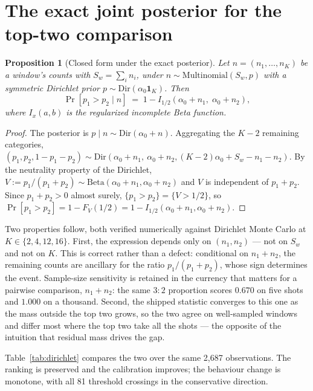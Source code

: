 \documentclass[final,5p,times,longtitle]{elsarticle}
\theoremstyle{plain}
\newtheorem{proposition}{Proposition}[section]
\begin{document}

\section{The exact joint posterior for the top-two comparison}
\label{si:dirichlet}

\begin{proposition}[Closed form under the exact posterior]
\label{prop:dirichlet}
Let $n=(n_1,\dots,n_K)$ be a window's counts with $S_w=\sum_i n_i$, under
$n\sim\mathrm{Multinomial}(S_w,p)$ with a symmetric Dirichlet prior
$p\sim\mathrm{Dir}(\alpha_0\mathbf{1}_K)$. Then
\[
  \Pr[p_1>p_2\mid n] \;=\; 1-I_{1/2}(\alpha_0+n_1,\;\alpha_0+n_2),
\]
where $I_x(a,b)$ is the regularized incomplete Beta function.
\end{proposition}

\begin{proof}
The posterior is $p\mid n\sim\mathrm{Dir}(\alpha_0+n)$. Aggregating the
$K-2$ remaining categories,
$(p_1,p_2,1-p_1-p_2)\sim\mathrm{Dir}(\alpha_0+n_1,\ \alpha_0+n_2,
(K-2)\alpha_0+S_w-n_1-n_2)$. By the neutrality property of the Dirichlet,
$V:=p_1/(p_1+p_2)\sim\mathrm{Beta}(\alpha_0+n_1,\alpha_0+n_2)$ and $V$ is
independent of $p_1+p_2$. Since $p_1+p_2>0$ almost surely,
$\{p_1>p_2\}=\{V>1/2\}$, so
$\Pr[p_1>p_2]=1-F_V(1/2)=1-I_{1/2}(\alpha_0+n_1,\alpha_0+n_2)$.
\end{proof}

Two properties follow, both verified numerically against Dirichlet Monte
Carlo at $K\in\{2,4,12,16\}$. First, the expression depends only on
$(n_1,n_2)$ --- not on $S_w$ and not on $K$. This is correct rather than a
defect: conditional on $n_1+n_2$, the remaining counts are ancillary for
the ratio $p_1/(p_1+p_2)$, whose sign determines the event. Sample-size
sensitivity is retained in the currency that matters for a pairwise
comparison, $n_1+n_2$: the same $3{:}2$ proportion scores $0.670$ on five
shots and $1.000$ on a thousand. Second, the shipped statistic converges to
this one as the mass outside the top two grows, so the two agree on
well-sampled windows and differ most where the top two take all the shots
--- the opposite of the intuition that residual mass drives the gap.

Table~\ref{tab:dirichlet} compares the two over the same 2{,}687
observations. The ranking is preserved and the calibration improves; the
behaviour change is monotone, with all 81 threshold crossings in the
conservative direction.
\end{document}
